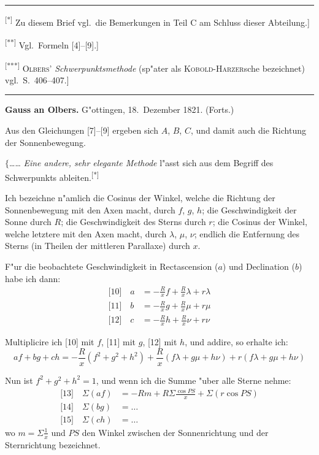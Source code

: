 \documentclass[12pt,a4paper]{article}
\theoremstyle{plain}
\theoremstyle{definition}
\theoremstyle{remark}
\begin{document}
\rule{\textwidth}{0.4pt}
{\small
\textsuperscript{[*]} Zu diesem Brief vgl.\ die Bemerkungen in Teil C am Schluss dieser Abteilung.]

\textsuperscript{[**]} Vgl.\ Formeln [4]--[9].]

\textsuperscript{[***]} \textsc{Olbers'} {\itshape Schwerpunktsmethode} (sp"ater als \textsc{Kobold-Harzer}sche bezeichnet) vgl.\ S.\ 406--407.]
}
\rule{\textwidth}{0.4pt}


\newpage
\begin{center}
\textbf{Gauss an Olbers.} \quad G"ottingen, 18.\ Dezember 1821. (Forts.)
\end{center}

Aus den Gleichungen [7]--[9] ergeben sich $A$, $B$, $C$, und damit auch die Richtung der Sonnenbewegung.

\noindent
$\{$\ldots{}\ldots{} {\itshape Eine andere, sehr elegante Methode} l"asst sich aus dem Begriff des Schwerpunkts ableiten.\textsuperscript{[*]}

Ich bezeichne n"amlich die Cosinus der Winkel, welche die Richtung der Sonnenbewegung mit den Axen macht, durch $f$, $g$, $h$; die Geschwindigkeit der Sonne durch $R$; die Geschwindigkeit des Sterns durch $r$; die Cosinus der Winkel, welche letztere mit den Axen macht, durch $\lambda$, $\mu$, $\nu$; endlich die Entfernung des Sterns (in Theilen der mittleren Parallaxe) durch $x$.

F"ur die beobachtete Geschwindigkeit in Rectascension ($a$) und Declination ($b$) habe ich dann:
\begin{align*}
\text{[10]}\quad a &= -\frac{R}{x}f + \frac{R}{x}\lambda + r\lambda\\
\text{[11]}\quad b &= -\frac{R}{x}g + \frac{R}{x}\mu + r\mu\\
\text{[12]}\quad c &= -\frac{R}{x}h + \frac{R}{x}\nu + r\nu
\end{align*}

Multiplicire ich [10] mit $f$, [11] mit $g$, [12] mit $h$, und addire, so erhalte ich:
\[
af + bg + ch = -\frac{R}{x}(f^2 + g^2 + h^2) + \frac{R}{x}(f\lambda + g\mu + h\nu) + r(f\lambda + g\mu + h\nu)
\]

Nun ist $f^2 + g^2 + h^2 = 1$, und wenn ich die Summe "uber alle Sterne nehme:
\begin{align*}
\text{[13]}\quad \Sigma(af) &= -Rm + R\Sigma\frac{\cos PS}{x} + \Sigma(r\cos PS)\\
\text{[14]}\quad \Sigma(bg) &= \ldots\\
\text{[15]}\quad \Sigma(ch) &= \ldots
\end{align*}
wo $m = \Sigma\frac{1}{x}$ und $PS$ den Winkel zwischen der Sonnenrichtung und der Sternrichtung bezeichnet.
\end{document}
